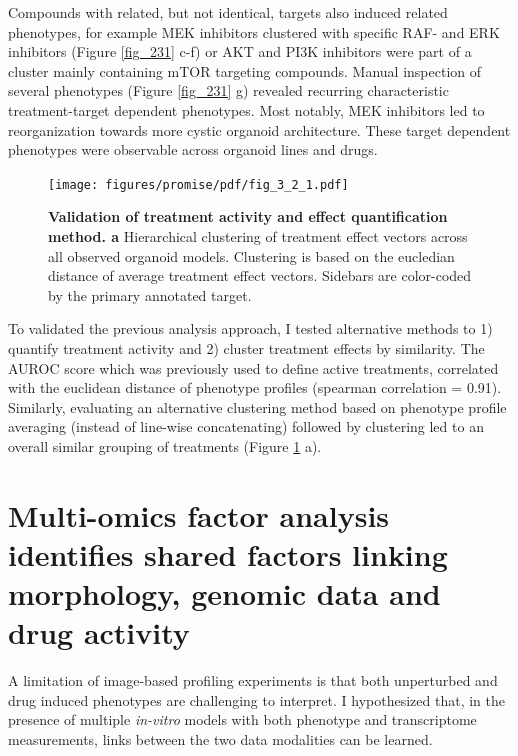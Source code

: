 \begin{flushleft}
Compounds with related, but not identical, targets also induced related phenotypes, for example MEK inhibitors clustered with specific RAF- and ERK inhibitors (Figure \ref{fig_231} c-f) or AKT and PI3K inhibitors were part of a cluster mainly containing mTOR targeting compounds. Manual inspection of several phenotypes (Figure \ref{fig_231} g) revealed recurring characteristic treatment-target dependent phenotypes. Most notably, MEK inhibitors led to reorganization towards more cystic organoid architecture. These target dependent phenotypes were observable across organoid lines and drugs.


\begin{figure}[h!]
\centering
\texttt{[image: figures/promise/pdf/fig\_3\_2\_1.pdf]}
\caption[Validation of treatment activity and effect quantification method]{\textbf{Validation of treatment activity and effect quantification method. a} Hierarchical clustering of treatment effect vectors across all observed organoid models. Clustering is based on the eucledian distance of average treatment effect vectors. Sidebars are color-coded by the primary annotated target.}
\label{fig_232}
\end{figure}
\bigbreak

To validated the previous analysis approach, I tested alternative methods to 1) quantify treatment activity and 2) cluster treatment effects by similarity. The AUROC score which was previously used to define active treatments, correlated with the euclidean distance of phenotype profiles (spearman correlation = 0.91). Similarly, evaluating an alternative clustering method based on phenotype profile averaging (instead of line-wise concatenating) followed by clustering led to an overall similar grouping of treatments (Figure \ref{fig_232} a). 

\newpage

\section{Multi-omics factor analysis identifies shared factors linking morphology, genomic data and drug activity}

A limitation of image-based profiling experiments is that both unperturbed and drug induced phenotypes are challenging to interpret. I hypothesized that, in the presence of multiple \textit{in-vitro} models with both phenotype and transcriptome measurements, links between the two data modalities can be learned. 


\end{flushleft}
